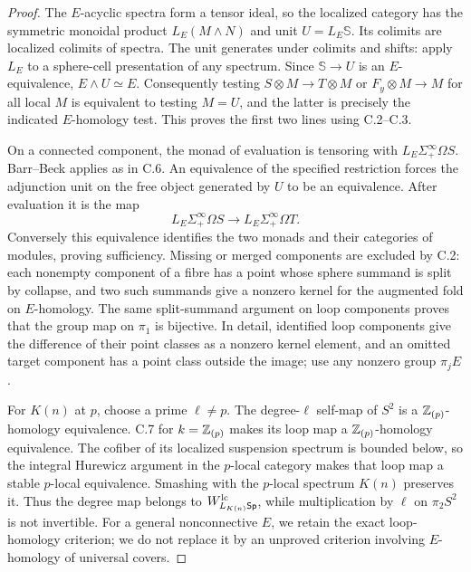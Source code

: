 \begin{proof}
The $E$-acyclic spectra form a tensor ideal, so the localized category has the symmetric monoidal product $L_E(M\wedge N)$ and unit $U=L_E\mathbb S$.  Its colimits are localized colimits of spectra.  The unit generates under colimits and shifts: apply $L_E$ to a sphere-cell presentation of any spectrum.  Since $\mathbb S\to U$ is an $E$-equivalence, $E\wedge U\simeq E$.  Consequently testing $S\otimes M\to T\otimes M$ or $F_y\otimes M\to M$ for all local $M$ is equivalent to testing $M=U$, and the latter is precisely the indicated $E$-homology test.  This proves the first two lines using C.2--C.3.

On a connected component, the monad of evaluation is tensoring with $L_E\Sigma^\infty_+\Omega S$.  Barr--Beck applies as in C.6.  An equivalence of the specified restriction forces the adjunction unit on the free object generated by $U$ to be an equivalence.  After evaluation it is the map
\[
 L_E\Sigma^\infty_+\Omega S\longrightarrow L_E\Sigma^\infty_+\Omega T.
\]
Conversely this equivalence identifies the two monads and their categories of modules, proving sufficiency.  Missing or merged components are excluded by C.2: each nonempty component of a fibre has a point whose sphere summand is split by collapse, and two such summands give a nonzero kernel for the augmented fold on $E$-homology.  The same split-summand argument on loop components proves that the group map on $\pi_1$ is bijective.  In detail, identified loop components give the difference of their point classes as a nonzero kernel element, and an omitted target component has a point class outside the image; use any nonzero group $\pi_jE$.

For $K(n)$ at $p$, choose a prime $\ell\ne p$.  The degree-$\ell$ self-map of $S^2$ is a $\mathbb Z_{(p)}$-homology equivalence.  C.7 for $k=\mathbb Z_{(p)}$ makes its loop map a $\mathbb Z_{(p)}$-homology equivalence.  The cofiber of its localized suspension spectrum is bounded below, so the integral Hurewicz argument in the $p$-local category makes that loop map a stable $p$-local equivalence.  Smashing with the $p$-local spectrum $K(n)$ preserves it.  Thus the degree map belongs to $W^{\mathrm{lc}}_{L_{K(n)}\mathsf{Sp}}$, while multiplication by $\ell$ on $\pi_2S^2$ is not invertible.  For a general nonconnective $E$, we retain the exact loop-homology criterion; we do not replace it by an unproved criterion involving $E$-homology of universal covers.
\end{proof}

